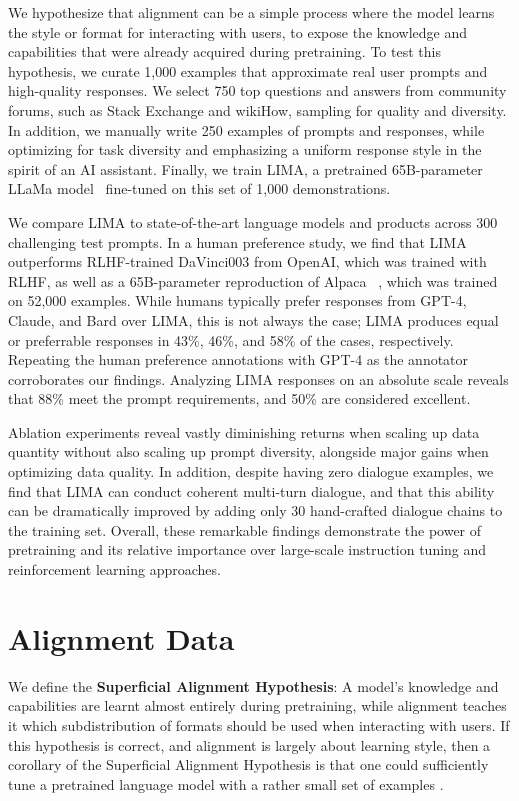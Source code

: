 \documentclass{article}
\newcommand\hypothesis{Superficial Alignment Hypothesis}
\begin{document}
We hypothesize that alignment can be a simple process where the model learns the style or format for interacting with users, to expose the knowledge and capabilities that were already acquired during pretraining.
To test this hypothesis, we curate 1,000 examples that approximate real user prompts and high-quality responses.
We select 750 top questions and answers from community forums, such as Stack Exchange and wikiHow, sampling for quality and diversity.
In addition, we manually write 250 examples of prompts and responses, while optimizing for task diversity and emphasizing a uniform response style in the spirit of an AI assistant.
Finally, we train LIMA, a pretrained 65B-parameter LLaMa model~\citep{touvron2023llama} fine-tuned on this set of 1,000 demonstrations.

We compare LIMA to state-of-the-art language models and products across 300 challenging test prompts.
In a human preference study, we find that LIMA outperforms RLHF-trained DaVinci003 from OpenAI, which was trained with RLHF, as well as a 65B-parameter reproduction of Alpaca
~\citep{alpaca}, which was trained on 52,000 examples.
While humans typically prefer responses from GPT-4, Claude, and Bard over LIMA, this is not always the case; LIMA produces equal or preferrable responses in 43\%, 46\%, and 58\% of the cases, respectively.
Repeating the human preference annotations with GPT-4 as the annotator corroborates our findings.
Analyzing LIMA responses on an absolute scale reveals that 88\% meet the prompt requirements, and 50\% are considered excellent.

Ablation experiments reveal vastly diminishing returns when scaling up data quantity without also scaling up prompt diversity, alongside major gains when optimizing data quality.
In addition, despite having zero dialogue examples, we find that LIMA can conduct coherent multi-turn dialogue, and that this ability can be dramatically improved by adding only 30 hand-crafted dialogue chains to the training set.
Overall, these remarkable findings demonstrate the power of pretraining and its relative importance over large-scale instruction tuning and reinforcement learning approaches.

\section{Alignment Data}
\label{sec:data}

We define the \textbf{Superficial Alignment Hypothesis}:
A model's knowledge and capabilities are learnt almost entirely during pretraining, while alignment teaches it which subdistribution of formats should be used when interacting with users.
If this hypothesis is correct, and alignment is largely about learning style, then a corollary of the \hypothesis{} is that one could sufficiently tune a pretrained language model with a rather small set of examples \citep{kirstain2021examples}.
\end{document}
